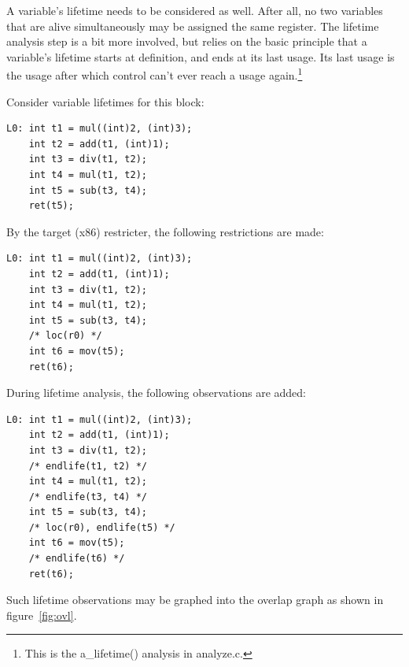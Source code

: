 \documentclass[12pt, a4paper]{article}
\begin{document}
A variable's lifetime needs to be considered as well. After all, no two
variables that are alive simultaneously may be assigned the same register. The
lifetime analysis step is a bit more involved, but relies on the basic principle
that a variable's lifetime starts at definition, and ends at its last usage. Its
last usage is the usage after which control can't ever reach a usage
again.\footnote{This is the a\_lifetime() analysis in analyze.c.}

Consider variable lifetimes for this block:

\begin{lstlisting}
L0:	int t1 = mul((int)2, (int)3);
	int t2 = add(t1, (int)1);
	int t3 = div(t1, t2);
	int t4 = mul(t1, t2);
	int t5 = sub(t3, t4);
	ret(t5);
\end{lstlisting}

By the target (x86) restricter, the following restrictions are made:

\begin{lstlisting}
L0:	int t1 = mul((int)2, (int)3);
	int t2 = add(t1, (int)1);
	int t3 = div(t1, t2);
	int t4 = mul(t1, t2);
	int t5 = sub(t3, t4);
	/* loc(r0) */
	int t6 = mov(t5);
	ret(t6);
\end{lstlisting}

During lifetime analysis, the following observations are added:

\begin{lstlisting}
L0:	int t1 = mul((int)2, (int)3);
	int t2 = add(t1, (int)1);
	int t3 = div(t1, t2);
	/* endlife(t1, t2) */
	int t4 = mul(t1, t2);
	/* endlife(t3, t4) */
	int t5 = sub(t3, t4);
	/* loc(r0), endlife(t5) */
	int t6 = mov(t5);
	/* endlife(t6) */
	ret(t6);
\end{lstlisting}

Such lifetime observations may be graphed into the overlap graph as shown in
figure~\ref{fig:ovl}.
\end{document}

